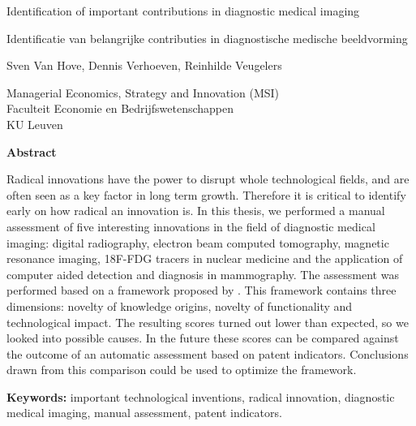 
\cleardoublepage
\thispagestyle{plain}
\begin{center}
    \Huge 
    Identification of important contributions in diagnostic medical imaging
    
    \vspace{0.5cm}
    
    \large
    Identificatie van belangrijke contributies in diagnostische medische beeldvorming
    
    \vspace{1.0cm}
    
    Sven Van Hove, Dennis Verhoeven, Reinhilde Veugelers
    
    \vspace{0.5cm}
    
	Managerial Economics, Strategy and Innovation (MSI)\\
	Faculteit Economie en Bedrijfswetenschappen\\
	KU Leuven
    
    \vspace{1.0cm}
    \textbf{Abstract}
\end{center}

Radical innovations have the power to disrupt whole technological fields, and
are often seen as a key factor in long term growth. Therefore it is critical to
identify early on how radical an innovation is. In this thesis, we performed a
manual assessment of five interesting innovations in the field of diagnostic medical
imaging: digital radiography, electron beam computed tomography, magnetic
resonance imaging, 18F-FDG tracers in nuclear medicine and the application of
computer aided detection and diagnosis in mammography. The assessment was
performed based on a framework proposed by \cite{verhoeven}. This framework
contains three dimensions: novelty of knowledge origins, novelty of
functionality  and technological impact. The resulting scores turned out lower
than expected, so we looked into possible causes. In the future these scores can
be compared against the outcome of an automatic assessment based on patent
indicators. Conclusions drawn from this comparison could be used to optimize the
framework.

\vspace{1.0cm}

\textbf{Keywords:} important technological inventions, radical innovation,
diagnostic medical imaging, manual assessment, patent indicators.